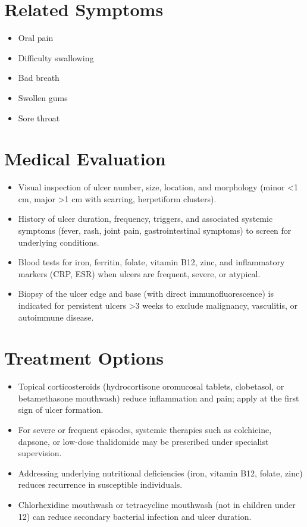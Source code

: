 \section*{Related Symptoms}
\begin{itemize}
  \item Oral pain
  \item Difficulty swallowing
  \item Bad breath
  \item Swollen gums
  \item Sore throat
\end{itemize}

\section*{Medical Evaluation}
\begin{itemize}
  \item Visual inspection of ulcer number, size, location, and morphology (minor <1 cm, major >1 cm with scarring, herpetiform clusters).
  \item History of ulcer duration, frequency, triggers, and associated systemic symptoms (fever, rash, joint pain, gastrointestinal symptoms) to screen for underlying conditions.
  \item Blood tests for iron, ferritin, folate, vitamin B12, zinc, and inflammatory markers (CRP, ESR) when ulcers are frequent, severe, or atypical.
  \item Biopsy of the ulcer edge and base (with direct immunofluorescence) is indicated for persistent ulcers >3 weeks to exclude malignancy, vasculitis, or autoimmune disease.
\end{itemize}

\section*{Treatment Options}
\begin{itemize}
  \item Topical corticosteroids (hydrocortisone oromucosal tablets, clobetasol, or betamethasone mouthwash) reduce inflammation and pain; apply at the first sign of ulcer formation.
  \item For severe or frequent episodes, systemic therapies such as colchicine, dapsone, or low-dose thalidomide may be prescribed under specialist supervision.
  \item Addressing underlying nutritional deficiencies (iron, vitamin B12, folate, zinc) reduces recurrence in susceptible individuals.
  \item Chlorhexidine mouthwash or tetracycline mouthwash (not in children under 12) can reduce secondary bacterial infection and ulcer duration.
\end{itemize}


